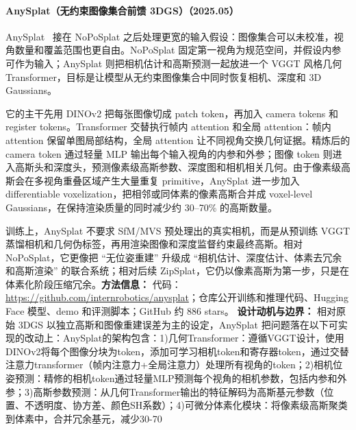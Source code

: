 \paragraph{AnySplat（无约束图像集合前馈 3DGS）（2025.05）}
AnySplat~\cite{2505_23716} 接在 NoPoSplat 之后处理更宽的输入假设：图像集合可以未校准，视角数量和覆盖范围也更自由。NoPoSplat 固定第一视角为规范空间，并假设内参可作为输入；AnySplat 则把相机估计和高斯预测一起放进一个 VGGT 风格几何 Transformer，目标是让模型从无约束图像集合中同时恢复相机、深度和 3D Gaussians。

它的主干先用 DINOv2 把每张图像切成 patch token，再加入 camera tokens 和 register tokens。Transformer 交替执行帧内 attention 和全局 attention：帧内 attention 保留单图局部结构，全局 attention 让不同视角交换几何证据。精炼后的 camera token 通过轻量 MLP 输出每个输入视角的内参和外参；图像 token 则进入高斯头和深度头，预测像素级高斯参数、深度图和相机相关几何。由于像素级高斯会在多视角重叠区域产生大量重复 primitive，AnySplat 进一步加入 differentiable voxelization，把相邻或同体素的像素高斯合并成 voxel-level Gaussians，在保持渲染质量的同时减少约 30--70\% 的高斯数量。

训练上，AnySplat 不要求 SfM/MVS 预处理出的真实相机，而是从预训练 VGGT 蒸馏相机和几何伪标签，再用渲染图像和深度监督约束最终高斯。相对 NoPoSplat，它更像把 ``无位姿重建'' 升级成 ``相机估计、深度估计、体素去冗余和高斯渲染'' 的联合系统；相对后续 ZipSplat，它仍以像素高斯为第一步，只是在体素化阶段压缩冗余。\textbf{方法信息：} 代码：\url{https://github.com/internrobotics/anysplat}；仓库公开训练和推理代码、Hugging Face 模型、demo 和评测脚本；GitHub 约 886 stars。
\textbf{设计动机与边界：} 相对原始 3DGS 以独立高斯和图像重建误差为主的设定，AnySplat 把问题落在以下可实现的改动上：AnySplat的架构包含：1)几何Transformer：遵循VGGT设计，使用DINOv2将每个图像分块为token，添加可学习相机token和寄存器token，通过交替注意力transformer（帧内注意力+全局注意力）处理所有视角的token；2)相机位姿预测：精修的相机token通过轻量MLP预测每个视角的相机参数，包括内参和外参；3)高斯参数预测：从几何Transformer输出的特征解码为高斯基元参数（位置、不透明度、协方差、颜色SH系数）；4)可微分体素化模块：将像素级高斯聚类到体素中，合并冗余基元，减少30-70%
